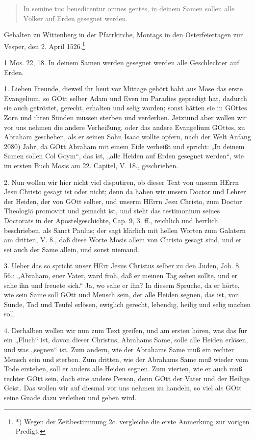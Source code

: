 \begin{quote}
In semine tuo benedicentur omnes gentes, in deinem Samen sollen alle Völker auf Erden gesegnet werden.
\end{quote}

Gehalten zu Wittenberg in der Pfarrkirche, Montags in den Osterfeiertagen zur Vesper, den 2. April 1526.\footnote{*) Wegen der Zeitbestimmung 2c. vergleiche die erste Anmerkung zur vorigen Predigt.}

1 Mos. 22, 18. In deinem Samen werden gesegnet werden alle Geschlechter auf Erden.

1. Lieben Freunde, dieweil ihr heut vor Mittage gehört habt aus Mose das erste Evangelium, so GOtt selber Adam und Even im Paradies gepredigt hat, dadurch sie auch getröstet, gerecht, erhalten und selig worden; sonst hätten sie in GOttes Zorn und ihren Sünden müssen sterben und verderben. Jetztund aber wollen wir vor uns nehmen die andere Verheißung, oder das andere Evangelium GOttes, zu Abraham geschehen, als er seinen Sohn Isaac wollte opfern, nach der Welt Anfang 2080) Jahr, da GOtt Abraham mit einem Eide verheißt und spricht: „In deinem Samen sollen Col Goym“, das ist, „alle Heiden auf Erden gesegnet werden“, wie im ersten Buch Mosis am 22. Capitel, V. 18., geschrieben.

2. Nun wollen wir hier nicht viel disputiren, ob dieser Text von unserm HErrn Jesu Christo gesagt ist oder nicht; denn da haben wir unsern Doctor und Lehrer der Heiden, der von GOtt selber, und unserm HErrn Jesu Christo, zum Doctor Theologiä promovirt und gemacht ist, und steht das testimonium seines Doctorats in der Apostelgeschichte, Cap. 9, 3. ff., reichlich und herrlich beschrieben, als Sanct Paulus; der sagt klärlich mit hellen Worten zum Galatern am dritten, V. 8., daß diese Worte Mosis allein von Christo gesagt sind, und er sei auch der Same allein, und sonst niemand.

3. Ueber das so spricht unser HErr Jesus Christus selber zu den Juden, Joh. 8, 56.: „Abraham, euer Vater, ward froh, daß er meinen Tag sehen sollte, und er sahe ihn und freuete sich.“ Ja, wo sahe er ihn? In diesem Spruche, da er hörte, wie sein Same soll GOtt und Mensch sein, der alle Heiden segnen, das ist, von Sünde, Tod und Teufel erlösen, ewiglich gerecht, lebendig, heilig und selig machen soll.

4. Derhalben wollen wir nun zum Text greifen, und am ersten hören, was das für ein „Fluch“ ist, davon dieser Christus, Abrahams Same, solle alle Heiden erlösen, und was „segnen“ ist. Zum andern, wie der Abrahams Same muß ein rechter Mensch sein und sterben. Zum dritten, wie der Abrahams Same muß wieder vom Tode erstehen, soll er anders alle Heiden segnen. Zum vierten, wie er auch muß rechter GOtt sein, doch eine andere Person, denn GOtt der Vater und der Heilige Geist. Das wollen wir auf diesmal vor uns nehmen zu handeln, so viel als GOtt seine Gnade dazu verleihen und geben wird.

